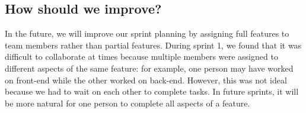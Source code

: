 \documentclass[12pt]{article}
\begin{document}
\subsection*{How should we improve?}

In the future, we will improve our sprint planning by assigning full features to team members rather than partial features. During sprint 1, we found that it was difficult to collaborate at times because multiple members were assigned to different aspects of the same feature: for example, one person may have worked on front-end while the other worked on back-end. However, this was not ideal because we had to wait on each other to complete tasks. In future sprints, it will be more natural for one person to complete all aspects of a feature.
\end{document}
